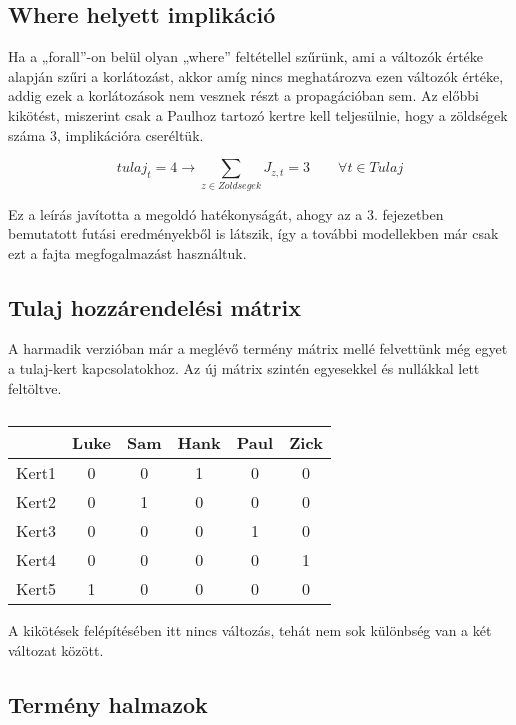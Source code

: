 \documentclass[12pt,a4paper,twoside, openright]{report}
\begin{document}
\subsection{Where helyett implikáció}

    Ha a „forall”-on belül olyan „where” feltétellel szűrünk, ami a változók értéke alapján szűri a korlátozást, akkor amíg nincs meghatározva ezen változók értéke, addig ezek a korlátozások nem vesznek részt a propagációban sem.
    Az előbbi kikötést, miszerint csak a Paulhoz tartozó kertre kell teljesülnie, hogy a zöldségek száma 3, implikációra cseréltük.

    \begin{equation}
    tulaj_t=4 \rightarrow \sum_{z\in Zoldsegek} J_{z,t} =3 \qquad \forall t\in Tulaj
    \end{equation}

    Ez a leírás javította a megoldó hatékonyságát, ahogy az a 3. fejezetben bemutatott futási eredményekből is látszik, így a további modellekben már csak ezt a fajta megfogalmazást 
    használtuk.


\subsection{Tulaj hozzárendelési mátrix}

    A harmadik verzióban már a meglévő termény mátrix mellé felvettünk még egyet a tulaj-kert kapcsolatokhoz.
    Az új mátrix szintén egyesekkel és nullákkal lett feltöltve.
	
	\begin{table}
		\centering
		\caption{}
		\begin{tabular}{|c|c|c|c|c|c|}
			\hline 
			& Luke & Sam & Hank & Paul & Zick \\ 
			\hline 
			Kert1 & 0 & 0 & 1 & 0 & 0 \\ 
			\hline 
			Kert2 & 0 & 1 & 0 & 0 & 0 \\ 
			\hline 
			Kert3 & 0 & 0 & 0 & 1 & 0 \\ 
			\hline 
			Kert4 & 0 & 0 & 0 & 0 & 1 \\ 
			\hline 
			Kert5 & 1 & 0 & 0 & 0 & 0 \\ 
			\hline 
		\end{tabular}
	\end{table}
     

    A kikötések felépítésében itt nincs változás, tehát nem sok különbség van a két változat között.

\subsection{Termény halmazok}
\end{document}
